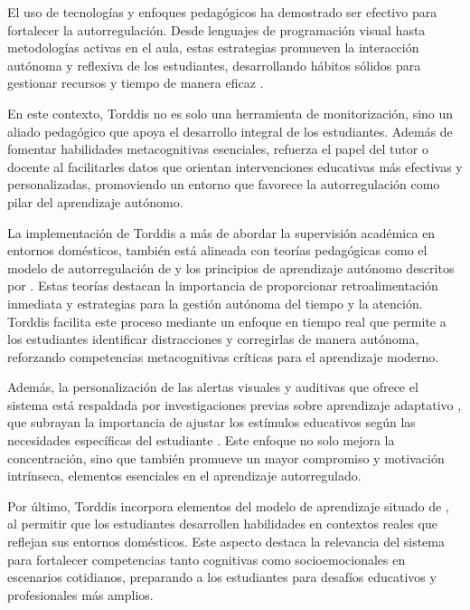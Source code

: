 \documentclass[a4paper,fleqn]{cas-sc}
\begin{document}
			El uso de tecnologías y enfoques pedagógicos ha demostrado ser efectivo para fortalecer la autorregulación. Desde lenguajes de programación visual hasta metodologías activas en el aula, estas estrategias promueven la interacción autónoma y reflexiva de los estudiantes, desarrollando hábitos sólidos para gestionar recursos y tiempo de manera eficaz \citep{SaezLopez2016Visual,Mohamed2018Implementing,Palioura2025Storylling}.
		
			En este contexto, Torddis no es solo una herramienta de monitorización, sino un aliado pedagógico que apoya el desarrollo integral de los estudiantes. Además de fomentar habilidades metacognitivas esenciales, refuerza el papel del tutor o docente al facilitarles datos que orientan intervenciones educativas más efectivas y personalizadas, promoviendo un entorno que favorece la autorregulación como pilar del aprendizaje autónomo.
		
			La implementación de Torddis a más de abordar la supervisión académica en entornos domésticos, también está alineada con teorías pedagógicas como el modelo de autorregulación de \cite{Zimmerman2013Self} y los principios de aprendizaje autónomo descritos por \cite{Tough1985Andragogy}. Estas teorías destacan la importancia de proporcionar retroalimentación inmediata y estrategias para la gestión autónoma del tiempo y la atención. Torddis facilita este proceso mediante un enfoque en tiempo real que permite a los estudiantes identificar distracciones y corregirlas de manera autónoma, reforzando competencias metacognitivas críticas para el aprendizaje moderno.
			
			Además, la personalización de las alertas visuales y auditivas que ofrece el sistema está respaldada por investigaciones previas sobre aprendizaje adaptativo \citep{Dhananjaya2024Digital, Mwambe2022}, que subrayan la importancia de ajustar los estímulos educativos según las necesidades específicas del estudiante \citep{Sundari2024Transforming}. Este enfoque no solo mejora la concentración, sino que también promueve un mayor compromiso y motivación intrínseca, elementos esenciales en el aprendizaje autorregulado.
			
			Por último, Torddis incorpora elementos del modelo de aprendizaje situado de \cite{Brown1989}, al permitir que los estudiantes desarrollen habilidades en contextos reales que reflejan sus entornos domésticos. Este aspecto destaca la relevancia del sistema para fortalecer competencias tanto cognitivas como socioemocionales en escenarios cotidianos, preparando a los estudiantes para desafíos educativos y profesionales más amplios.
			
\end{document}

